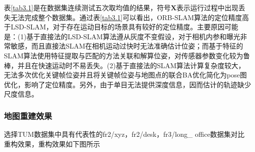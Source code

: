 表\ref{tab3.1}是在数据集连续测试五次取均值的结果，符号$\boldsymbol{X}$表示运行过程中出现丢失无法完成整个数据集。通过表\ref{tab3.1}可以看出，ORB-SLAM算法的定位精度高于LSD-SLAM，对于存在运动目标的场景具有较好的定位精度。主要原因可能是：(1)基于直接法的LSD-SLAM算法遵从灰度不变假设，对于相机内参和曝光非常敏感，而且直接法SLAM在相机运动过快时无法准确估计位姿；而基于特征的SLAM算法使用特征提取与匹配的方法关联和解算位姿，对传感器参数变化较为鲁棒，并且在快速运动时不易丢失。(2)基于直接法的SLAM算法计算复杂度较大，无法多次优化关键帧位姿并且将关键帧位姿与地图点的联合BA优化简化为pose图优化，影响了定位精度。另外，由于单目无法提供深度信息，因而估计的轨迹缺少尺度信息。

\subsubsection*{地图重建效果}
选择TUM数据集中具有代表性的fr2/xyz，fr2/desk，fr3/long\_ office数据集对比重构效果，重构效果如下图所示

